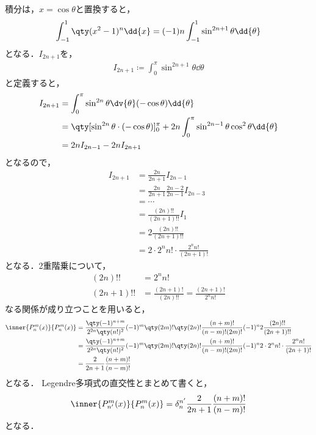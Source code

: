 \documentclass{report}
\begin{document}
      積分は，$x = \cos\theta$と置換すると，
      \begin{align}
        \int_{-1}^{1}\qty(x^2 - 1)^n\dd{x} = (-1)n\int_{-1}^{1}\sin^{2n + 1}\theta\dd{\theta}
      \end{align}
      となる．$I_{2n + 1}$を，
      \begin{align}
        I_{2n + 1} \coloneqq \int_{0}^{\pi}\sin^{2n + 1}\theta\dd{\theta}
      \end{align}
      と定義すると，
      \begin{align}
        I_{2n + 1} &= \int_{0}^{\pi} \sin^{2n}\theta\dv{\theta}(-\cos\theta)\dd{\theta} \\ 
        &= \qty[\sin^{2n}\theta\cdot(-\cos\theta)]_{0}^{\pi} + 2n\int_{0}^{\pi}\sin^{2n - 1}\theta \cos^2\theta\dd{\theta} \\ 
        &= 2nI_{2n - 1} - 2nI_{2n + 1}
      \end{align}
      となるので，
      \begin{align}
        I_{2n + 1} &= \frac{2n}{2n + 1}I_{2n - 1} \\ 
        &= \frac{2n}{2n + 1}\frac{2n - 2}{2n - 1}I_{2n - 3} \\ 
        &= \cdots \\ 
        &= \frac{(2n)!!}{(2n + 1)!!}I_1 \\ 
        &= 2\frac{(2n)!!}{(2n + 1)!!} \\ 
        &= 2\cdot 2^nn! \cdot \frac{2^nn!}{(2n + 1)!}
      \end{align}
      となる．2重階乗について，
      \begin{align}
        (2n)!! &= 2^nn! \\ 
        (2n + 1) !! &= \frac{(2n + 1)!}{(2n)!!} = \frac{(2n + 1)!}{2^nn!}
      \end{align}
      なる関係が成り立つことを用いると，
      \begin{align}
        \inner{P_{n}^m(x)}{P_{n}^m(x)} &= \frac{\qty(-1)^{n + m}}{2^{2n}\qty(n!)^2}(-1)^m\qty(2m)!\qty(2n)!\frac{(n + m)!}{(n - m)!(2m)!}(-1)^n2\frac{(2n)!!}{(2n + 1)!!} \\
        &=  \frac{\qty(-1)^{n + m}}{2^{2n}\qty(n!)^2}(-1)^m\qty(2m)!\qty(2n)!\frac{(n + m)!}{(n - m)!(2m)!}(-1)^n2\cdot 2^nn! \cdot \frac{2^nn!}{(2n + 1)!} \\
        &= \frac{2}{2n + 1}\frac{(n + m)!}{(n - m)!}
      \end{align}
      となる．
      Legendre多項式の直交性とまとめて書くと，
      \begin{align}
        \inner{P_{n'}^m(x)}{P_{n}^m(x)} = \delta_{n}^{n'}\frac{2}{2n + 1}\frac{(n + m)!}{(n - m)!}\label{pnm-norm}
      \end{align}
      となる．
\end{document}
